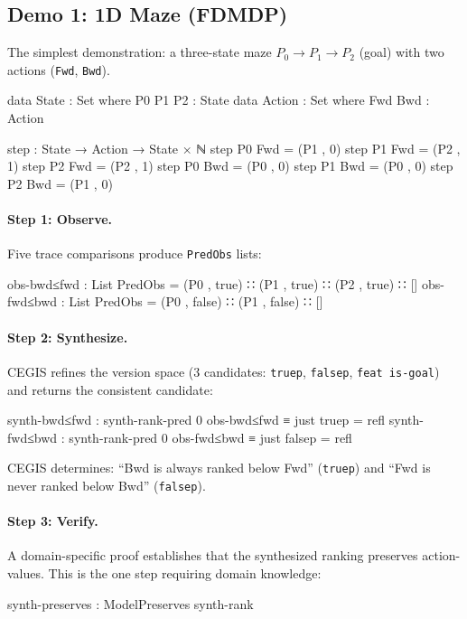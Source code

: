 \documentclass[9pt,a4paper]{article}
\theoremstyle{plain}
\theoremstyle{definition}
\theoremstyle{remark}
\begin{document}
\subsection{Demo 1: 1D Maze (FDMDP)}

The simplest demonstration: a three-state maze $P_0 \to P_1 \to P_2$ (goal) with two actions (\texttt{Fwd}, \texttt{Bwd}).

\begin{spec}
data State : Set where P0 P1 P2 : State
data Action : Set where Fwd Bwd : Action

step : State → Action → State × ℕ
step P0 Fwd = (P1 , 0)    step P1 Fwd = (P2 , 1)    step P2 Fwd = (P2 , 1)
step P0 Bwd = (P0 , 0)    step P1 Bwd = (P0 , 0)    step P2 Bwd = (P1 , 0)
\end{spec}

\paragraph{Step 1: Observe.}  Five trace comparisons produce \texttt{PredObs} lists:
\begin{spec}
obs-bwd≤fwd : List PredObs = (P0 , true) ∷ (P1 , true) ∷ (P2 , true) ∷ []
obs-fwd≤bwd : List PredObs = (P0 , false) ∷ (P1 , false) ∷ []
\end{spec}

\paragraph{Step 2: Synthesize.}  CEGIS refines the version space (3 candidates: \texttt{truep}, \texttt{falsep}, \texttt{feat is-goal}) and returns the consistent candidate:
\begin{spec}
synth-bwd≤fwd : synth-rank-pred 0 obs-bwd≤fwd ≡ just truep  = refl
synth-fwd≤bwd : synth-rank-pred 0 obs-fwd≤bwd ≡ just falsep = refl
\end{spec}
\noindent CEGIS determines: ``Bwd is always ranked below Fwd'' (\texttt{truep}) and ``Fwd is never ranked below Bwd'' (\texttt{falsep}).

\paragraph{Step 3: Verify.}  A domain-specific proof establishes that the synthesized ranking preserves action-values.  This is the one step requiring domain knowledge:
\begin{spec}
synth-preserves : ModelPreserves synth-rank
\end{spec}
\end{document}
